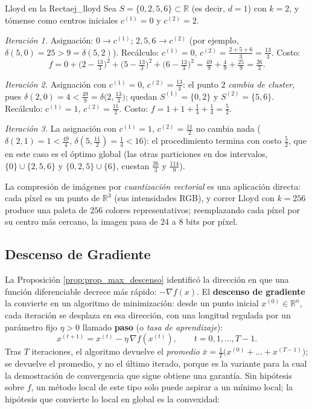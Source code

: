 \documentclass[11pt, a4paper]{article}
\begin{document}
\begin{ejemplo}{Lloyd en la Recta}{ej_lloyd}
Sea $S = \{0, 2, 5, 6\} \subset \mathbb{R}$ (es decir, $d = 1$) con $k = 2$, y tómense como centros iniciales $c^{(1)} = 0$ y $c^{(2)} = 2$.

\textit{Iteración 1.} Asignación: $0 \to c^{(1)}$; $2, 5, 6 \to c^{(2)}$ (por ejemplo, $\delta(5, 0) = 25 > 9 = \delta(5, 2)$). Recálculo: $c^{(1)} = 0$, $c^{(2)} = \frac{2+5+6}{3} = \frac{13}{3}$. Costo:
\[
f = 0 + \Big( 2 - \tfrac{13}{3} \Big)^2 + \Big( 5 - \tfrac{13}{3} \Big)^2 + \Big( 6 - \tfrac{13}{3} \Big)^2 = \tfrac{49}{9} + \tfrac{4}{9} + \tfrac{25}{9} = \tfrac{26}{3}.
\]

\textit{Iteración 2.} Asignación con $c^{(1)} = 0$, $c^{(2)} = \frac{13}{3}$: el punto $2$ \emph{cambia de cluster}, pues $\delta(2, 0) = 4 < \frac{49}{9} = \delta \big( 2, \frac{13}{3} \big)$; quedan $S^{(1)} = \{0, 2\}$ y $S^{(2)} = \{5, 6\}$. Recálculo: $c^{(1)} = 1$, $c^{(2)} = \frac{11}{2}$. Costo: $f = 1 + 1 + \frac{1}{4} + \frac{1}{4} = \frac{5}{2}$.

\textit{Iteración 3.} La asignación con $c^{(1)} = 1$, $c^{(2)} = \frac{11}{2}$ no cambia nada ($\delta(2,1) = 1 < \frac{49}{4}$, $\delta(5, \frac{11}{2}) = \frac{1}{4} < 16$): el procedimiento termina con costo $\frac{5}{2}$, que en este caso es el óptimo global (las otras particiones en dos intervalos, $\{0\} \cup \{2,5,6\}$ y $\{0,2,5\} \cup \{6\}$, cuestan $\frac{26}{3}$ y $\frac{114}{9}$).
\end{ejemplo}

\obs La compresión de imágenes por \emph{cuantización vectorial} es una aplicación directa: cada píxel es un punto de $\mathbb{R}^3$ (sus intensidades RGB), y correr Lloyd con $k = 256$ produce una paleta de $256$ colores representativos; reemplazando cada píxel por su centro más cercano, la imagen pasa de $24$ a $8$ bits por píxel.

\subsection{Descenso de Gradiente}

La Proposición \ref{prop:prop_max_descenso} identificó la dirección en que una función diferenciable decrece más rápido: $-\nabla f(x)$. El \textbf{descenso de gradiente} la convierte en un algoritmo de minimización: desde un punto inicial $x^{(0)} \in \mathbb{R}^n$, cada iteración se desplaza en esa dirección, con una longitud regulada por un parámetro fijo $\eta > 0$ llamado \textbf{paso} (o \emph{tasa de aprendizaje}):
\[
x^{(t+1)} = x^{(t)} - \eta \, \nabla f(x^{(t)}), \qquad t = 0, 1, \dots, T - 1.
\]
Tras $T$ iteraciones, el algoritmo devuelve el \emph{promedio} $\bar{x} = \frac{1}{T} \big( x^{(0)} + \dots + x^{(T-1)} \big)$; se devuelve el promedio, y no el último iterado, porque es la variante para la cual la demostración de convergencia que sigue obtiene una garantía. Sin hipótesis sobre $f$, un método local de este tipo solo puede aspirar a un mínimo local; la hipótesis que convierte lo local en global es la convexidad:
\end{document}

